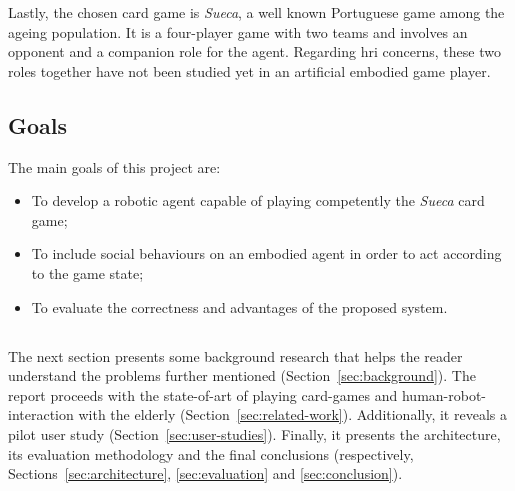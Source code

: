 


Lastly, the chosen card game is \emph{Sueca}, a well known Portuguese game among the ageing population.
It is a four-player game with two teams and involves an opponent and a companion role for the agent.
Regarding \gls{hri} concerns, these two roles together have not been studied yet in an artificial embodied game player.



\subsection{Goals}
\label{sec:goals}

The main goals of this project are:
\begin{itemize}
\item To develop a robotic agent capable of playing competently the \emph{Sueca} card game;
\item To include social behaviours on an embodied agent in order to act according to the game state;
\item To evaluate the correctness and advantages of the proposed system.
\end{itemize}

\subsection*{\centering*}

The next section presents some background research that helps the reader understand the problems further mentioned (Section~\ref{sec:background}).
The report proceeds with the state-of-art of playing card-games and human-robot-interaction with the elderly (Section~\ref{sec:related-work}).
Additionally, it reveals a pilot user study (Section~\ref{sec:user-studies}).
Finally, it presents the architecture, its evaluation methodology and the final conclusions (respectively, Sections~\ref{sec:architecture}, \ref{sec:evaluation} and \ref{sec:conclusion}).


